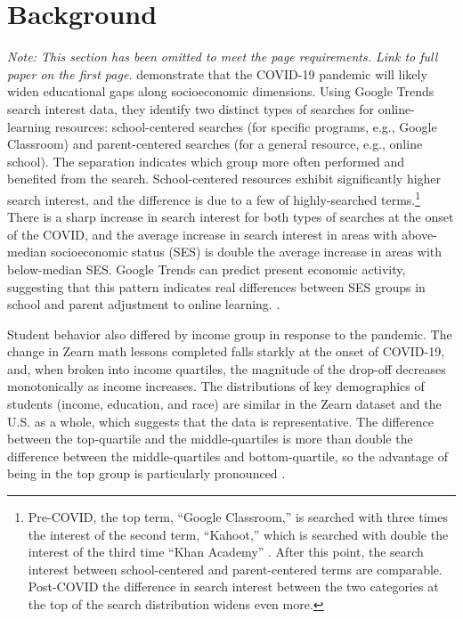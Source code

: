 \section{Background}
\if{}
{\small
    \textit{Note: This section has been omitted to meet the page requirements. Link to full paper on the first page.}
}
\fi
\if{}
\cite{bh1} demonstrate that the COVID-19 pandemic will likely widen educational gaps along socioeconomic dimensions.
Using Google Trends search interest data, they identify two distinct types of searches for online-learning resources: school-centered searches (for specific programs, e.g., Google Classroom) and parent-centered searches (for a general resource, e.g., online school).
The separation indicates which group more often performed and benefited from the search.
School-centered resources exhibit significantly higher search interest, and the difference is due to a few of highly-searched terms.\footnote{Pre-COVID, the top term, “Google Classroom,” is searched with three times the interest of the second term, “Kahoot,” which is searched with double the interest of the third time “Khan Academy” \cite{bh1}.
After this point, the search interest between school-centered and parent-centered terms are comparable.
Post-COVID the difference in search interest between the two categories at the top of the search distribution widens even more.}
There is a sharp increase in search interest for both types of searches at the onset of the COVID, and the average increase in search interest in areas with above-median socioeconomic status (SES) is double the average increase in areas with below-median SES.
Google Trends can predict present economic activity, suggesting that this pattern indicates real differences between SES groups in school and parent adjustment to online learning. \citep{choi}.

Student behavior also differed by income group in response to the pandemic.
The change in Zearn math lessons completed falls starkly at the onset of COVID-19, and, when broken into income quartiles, the magnitude of the drop-off decreases monotonically as income increases.
The distributions of key demographics of students (income, education, and race) are similar in the Zearn dataset and the U.S. as a whole, which suggests that the data is representative.
The difference between the top-quartile and the middle-quartiles is more than double the difference between the middle-quartiles and bottom-quartile, so the advantage of being in the top group is particularly pronounced \citep{chetty}.

